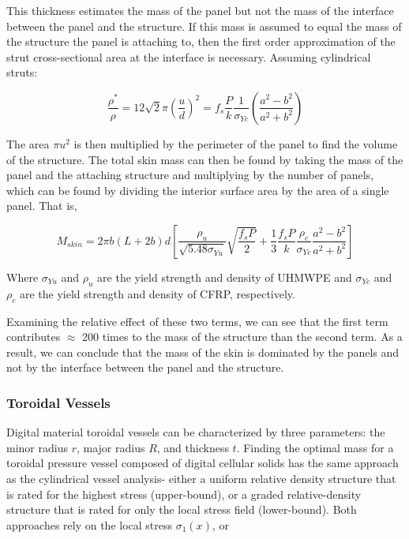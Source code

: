 \documentclass[twocolumn,letterpaper]{IEEEAerospaceCLS}  %
\begin{document}
This thickness estimates the mass of the panel but not the mass of the interface between the panel and the structure. If this mass is assumed to equal the mass of the structure the panel is attaching to, then the first order approximation of the strut cross-sectional area at the interface is necessary. Assuming cylindrical struts:

\begin{equation}
\frac{\rho^*}{\rho} = 12\sqrt{2}\pi\left(\frac{u}{d}\right)^2 = f_s\frac{P}{k}\frac{1}{\sigma_{Yc}}\left(\frac{a^2-b^2}{a^2+b^2}\right)
\end{equation}

The area $\pi u^2$ is then multiplied by the perimeter of the panel to find the volume of the structure. The total skin mass can then be found by taking the mass of the panel and the attaching structure and multiplying by the number of panels, which can be found by dividing the interior surface area by the area of a single panel. That is,

\begin{equation}
M_{skin} = 2\pi b(L+2b)d \left[\frac{\rho_u}{\sqrt{5.48\sigma_{Yu}}}\sqrt{\frac{f_s P}{2}} + \frac{1}{3}\frac{f_s P}{k}\frac{\rho_c}{\sigma_{Yc}}\frac{a^2-b^2}{a^2+b^2}\right]
\end{equation}

Where $\sigma_{Yu}$ and $\rho_u$ are the yield strength and density of UHMWPE and $\sigma_{Yc}$ and $\rho_c$ are the yield strength and density of CFRP, respectively. 

Examining the relative effect of these two terms, we can see that the first term contributes $\approx$ 200 times to the mass of the structure than the second term. As a result, we can conclude that the mass of the skin is dominated by the panels and not by the interface between the panel and the structure.

\subsubsection{Toroidal Vessels}
Digital material toroidal vessels can be characterized by three parameters: the minor radius $r$, major radius $R$, and thickness $t$. Finding the optimal mass for a toroidal pressure vessel composed of digital cellular solids has the same approach as the cylindrical vessel analysis- either a uniform relative density structure that is rated for the highest stress (upper-bound), or a graded relative-density structure that is rated for only the local stress field (lower-bound). Both approaches rely on the local stress $\sigma_1(x)$, or
\end{document}
